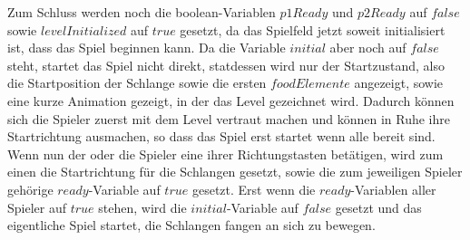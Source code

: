 Zum Schluss werden noch die boolean-Variablen $p1Ready$ und $p2Ready$ auf $false$ sowie $levelInitialized$ auf $true$ gesetzt, da das Spielfeld jetzt soweit initialisiert ist, dass das Spiel beginnen kann. Da die Variable $initial$ aber noch auf $false$ steht, startet das Spiel nicht direkt, statdessen wird nur der Startzustand, also die Startposition der Schlange sowie die ersten $foodElemente$ angezeigt, sowie eine kurze Animation gezeigt, in der das Level gezeichnet wird. Dadurch können sich die Spieler zuerst mit dem Level vertraut machen und können in Ruhe ihre Startrichtung ausmachen, so dass das Spiel erst startet wenn alle bereit sind. Wenn nun der oder die Spieler eine ihrer Richtungstasten betätigen, wird zum einen die Startrichtung für die Schlangen gesetzt, sowie die zum jeweiligen Spieler gehörige $ready$-Variable auf $true$ gesetzt. Erst wenn die $ready$-Variablen aller Spieler auf $true$ stehen, wird die $initial$-Variable auf $false$ gesetzt und das eigentliche Spiel startet, die Schlangen fangen an sich zu bewegen.
%


